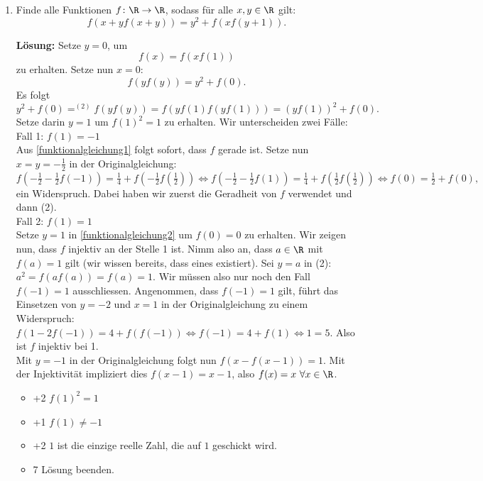 \documentclass[language=german,style=solution]{smo}
\begin{document}
\begin{enumerate}[label=\textbf{\arabic*.}]
\newpage

\item Finde alle Funktionen $f\colon\R\to\R$, sodass für alle $x,y\in\R$ gilt:
\[
f(x+yf(x+y))=y^2+f(xf(y+1)).
\]

\textbf{Lösung:}
Setze $y = 0$, um
\begin{equation}\label{funktionalgleichung1}
f(x) = f(xf(1))
\end{equation}
zu erhalten. Setze nun $x = 0$:
\begin{equation}\label{funktionalgleichung2}
f(yf(y)) = y^2 + f(0).
\end{equation}
Es folgt
\[
y^2 + f(0) =^{(2)} f(yf(y)) = f(yf(1)f(yf(1))) = (yf(1))^2 + f(0).
\]
Setze darin $y = 1$ um $f(1)^2 =  1$ zu erhalten. Wir unterscheiden zwei Fälle: \\
Fall 1: $f(1) = -1$ \\
Aus \eqref{funktionalgleichung1} folgt sofort, dass $f$ gerade ist. Setze nun $x = y = -\frac{1}{2}$ in der Originalgleichung: \\
$f( -\frac{1}{2}  -\frac{1}{2}f(-1)) = \frac{1}{4} + f( -\frac{1}{2}f( \frac{1}{2})) \Leftrightarrow
f( -\frac{1}{2}  -\frac{1}{2}f(1)) = \frac{1}{4} + f( \frac{1}{2}f( \frac{1}{2})) \Leftrightarrow f(0) = \frac{1}{2} + f(0),$ ein Widerspruch. Dabei haben wir zuerst die Geradheit von $f$ verwendet und dann (2). \\
Fall 2: $f(1) = 1$ \\
Setze $y = 1$ in \eqref{funktionalgleichung2} um $f(0) = 0$ zu erhalten. Wir zeigen nun, dass $f$ injektiv an der Stelle 1 ist. Nimm also an, dass $a \in \R$ mit $f(a) = 1$ gilt (wir wissen bereits, dass eines existiert). Sei $y = a$ in (2): $a^2 = f(af(a)) = f(a) = 1$. Wir müssen also nur noch den Fall $f(-1) = 1$ ausschliessen. Angenommen, dass $f(-1) = 1$ gilt, führt das Einsetzen von $y = -2$ und $x = 1$ in der Originalgleichung zu einem Widerspruch: $f(1 - 2f(-1)) = 4 + f(f(-1)) \Leftrightarrow f(-1) = 4 + f(1) \Leftrightarrow 1 = 5.$ Also ist $f$ injektiv bei 1. \\
Mit $y = -1$ in der Originalgleichung folgt nun $f(x - f(x - 1)) = 1$. Mit der Injektivität impliziert dies $f(x - 1) = x - 1$, also $f(x) = x \ \forall x \in \R$.

\begin{itemize}
\item +2 $f(1)^2=1$
\item +1 $f(1)\neq -1$
\item +2 $1$ ist die einzige reelle Zahl, die auf $1$ geschickt wird.
\item 7 Lösung beenden.
\end{itemize}


\end{enumerate}

\bigskip

\vspace{1cm}

\end{document}
